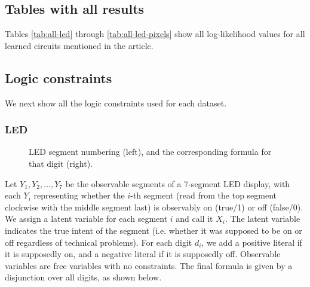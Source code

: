 \subsection{Tables with all results}

Tables \ref{tab:all-led} through \ref{tab:all-led-pixels} show all log-likelihood values for all learned
circuits mentioned in the article.



\newpage

\subsection{Logic constraints}

We next show all the logic constraints used for each dataset.

\subsubsection{LED}

\begin{figure}
  \caption{LED segment numbering (left), and the corresponding formula for that digit (right).}
\end{figure}

Let $Y_1,Y_2,\ldots,Y_7$ be the observable segments of a 7-segment LED display, with each $Y_i$
representing whether the $i$-th segment (read from the top segment clockwise with the middle
segment last) is observably on (true/1) or off (false/0). We assign a latent variable for each
segment $i$ and call it $X_i$. The latent variable indicates the true intent of the segment (i.e.
whether it was supposed to be on or off regardless of technical problems). For each digit $d_i$, we
add a positive literal if it is supposedly on, and a negative literal if it is supposedly off.
Observable variables are free variables with no constraints. The final formula is given by a
disjunction over all digits, as shown below.

